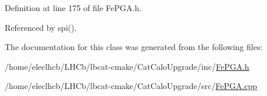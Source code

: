 Definition at line 175 of file Fe\+P\+G\+A.\+h.



Referenced by spi().



The documentation for this class was generated from the following files\+:\begin{DoxyCompactItemize}
\item 
/home/eleclhcb/\+L\+H\+Cb/lbcat-\/cmake/\+Cat\+Calo\+Upgrade/inc/\hyperlink{FePGA_8h}{Fe\+P\+G\+A.\+h}\item 
/home/eleclhcb/\+L\+H\+Cb/lbcat-\/cmake/\+Cat\+Calo\+Upgrade/src/\hyperlink{FePGA_8cpp}{Fe\+P\+G\+A.\+cpp}\end{DoxyCompactItemize}
